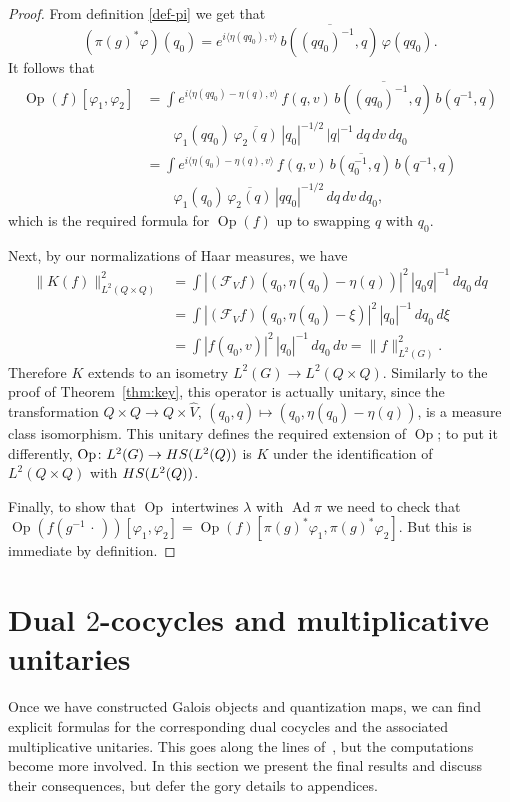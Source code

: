 \documentclass[a4paper,11pt,reqno]{amsart}
\numberwithin{equation}{section}
\theoremstyle{remark}
\theoremstyle{definition}
\newcommand\Ad{\operatorname{Ad}}
\newcommand\Op{\operatorname{Op}}
\newcommand\HS{{\rm HS}}
\newcommand{\vf}{\varphi}
\newcommand{\CF}{\mathcal F}
\begin{document}
\begin{proof}
From definition \eqref{def-pi} we get that
$$
(\pi(g)^*\vf)(q_0)=e^{i \langle\eta(qq_0),v\rangle}\,\overline{b ((qq_0)^{-1},q)}\,\vf(qq_0).
$$
It follows that
\begin{align*}
\Op(f)[\vf_1 ,\vf_2 ]&=\int e^{i \langle\eta(qq_0)-\eta(q),v\rangle}\, f(q,v)\,\overline{b ((qq_0)^{-1},q)}\,b (q^{-1},q)\\
&\qquad\vf_1(qq_0)\,\overline{\vf_2(q)}\,|q_0|^{-1/2}\,|q|^{-1}\,dq\,dv\,dq_0\\
&=\int e^{i \langle \eta(q_0)-\eta(q),v\rangle}\, f(q,v)\,\overline{b (q_0^{-1},q)}\,b (q^{-1},q)\\
&\qquad\vf_1(q_0)\,\overline{\vf_2(q)}\,|qq_0|^{-1/2}\,dq\,dv\,dq_0,
\end{align*}
which is the required formula for $\Op(f)$ up to swapping $q$ with $q_0$.

Next, by our normalizations of Haar measures, we have
\begin{align*}
\|K(f)\|^2_{L^2(Q\times Q)}&=\int |(\CF_V f)(q_0, \eta(q_0)-\eta(q))|^2\,|q_0q|^{-1}\,dq_0\,dq\\
&=\int |(\CF_V f)(q_0, \eta(q_0)-\xi)|^2\,|q_0|^{-1}\,dq_0\,d\xi\\
&=\int |f(q_0,v)|^2\,|q_0|^{-1}\,dq_0\,dv=\|f\|^2_{L^2(G)}.
\end{align*}
Therefore $K$ extends to an isometry $L^2(G)\to L^2(Q\times Q)$. Similarly to the proof of Theorem~\ref{thm:key}, this operator is actually unitary, since the transformation $Q\times Q\to Q\times\hat V$, $(q_0,q)\mapsto(q_0,\eta(q_0)-\eta(q))$, is a measure class isomorphism. This unitary defines the required extension of $\Op$; to put it differently, $\Op\colon L^2(G)\to \HS(L^2(Q))$ is $K$ under the identification of $L^2(Q\times Q)$ with $\HS(L^2(Q))$.

Finally, to show that $\Op$ intertwines $\lambda$ with $\Ad\pi$ we need to check that $\Op(f(g^{-1}\,\cdot\,))[\vf_1 ,\vf_2 ]=\Op(f)[\pi(g)^*\vf_1 ,\pi(g)^*\vf_2 ]$. But this is immediate by definition.
\end{proof}

\bigskip

\section{Dual \texorpdfstring{$2$}{2}-cocycles and multiplicative unitaries}\label{sec:2mult}

Once we have constructed Galois objects and quantization maps, we can find explicit formulas for the corresponding dual cocycles and the associated multiplicative unitaries. This goes along the lines of~, but the computations become more involved. In this section we present the final results and discuss their consequences, but defer the gory details to appendices.
\end{document}
